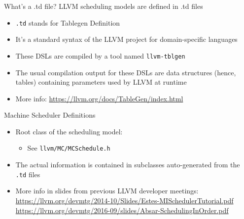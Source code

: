 \begin{frame}{What's a .td file?}
LLVM scheduling models are defined in \alert{.td} files\\
\medskip
\begin{itemize}
\item \texttt{.td} stands for \alert{Tablegen Definition}
\item It's a \alert{standard syntax} of the LLVM project for \alert{domain-specific languages}
\item These DSLs are compiled by a tool named \texttt{llvm-tblgen}
\item The usual compilation output for these DSLs are \alert{data structures} (hence, \alert{tables}) containing parameters used by LLVM at runtime
\medskip
\item More info: \url{https://llvm.org/docs/TableGen/index.html}
\end{itemize}
\end{frame}


\begin{frame}{Machine Scheduler Definitions}
\begin{itemize}
\item Root class of the scheduling model: 
	\begin{itemize}
	\item See \texttt{llvm/MC/MCSchedule.h}
	\end{itemize}
\item The actual information is contained in 
	subclasses auto-generated from the \texttt{.td} files

\medskip
\item More info in slides from previous LLVM developer meetings: \\\smallskip
\url{https://llvm.org/devmtg/2014-10/Slides/Estes-MISchedulerTutorial.pdf}\\\smallskip
\url{https://llvm.org/devmtg/2016-09/slides/Absar-SchedulingInOrder.pdf}
\end{itemize}
\end{frame}

